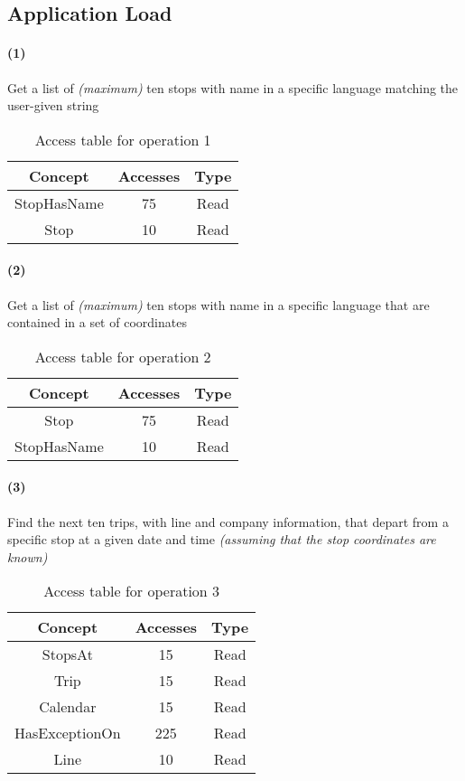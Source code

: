 \newpage
\subsection{Application Load}

\paragraph{(1)} Get a list of \textit{(maximum)} ten stops with name in a specific language matching the user-given string

\begin{table}[h]
	\centering
	\begin{tabular}{|c|c|c|}
		\hline
		\textbf{Concept} & \textbf{Accesses} & \textbf{Type} \\
		\hline
		StopHasName & 75 & Read \\ \hline
		Stop & 10 & Read \\ \hline
	\end{tabular}
	\caption{Access table for operation 1}\label{tbl:rest.access-1}
\end{table}

\paragraph{(2)} Get a list of \textit{(maximum)} ten stops with name in a specific language that are contained in a set of coordinates

\begin{table}[h]
	\centering
	\begin{tabular}{|c|c|c|}
		\hline
		\textbf{Concept} & \textbf{Accesses} & \textbf{Type} \\
		\hline
		Stop & 75 & Read \\ \hline
		StopHasName & 10 & Read \\ \hline
	\end{tabular}
	\caption{Access table for operation 2}\label{tbl:rest.access-2}
\end{table}

\paragraph{(3)} Find the next ten trips, with line and company information, that depart from a specific stop at a given date and time \textit{(assuming that the stop coordinates are known)}
\begin{table}[h]
	\centering
	\begin{tabular}{|c|c|c|}
		\hline
		\textbf{Concept} & \textbf{Accesses} & \textbf{Type} \\
		\hline
		StopsAt & 15 & Read \\ \hline
		Trip & 15 & Read \\ \hline
		Calendar & 15 & Read \\ \hline
		HasExceptionOn & 225 & Read \\ \hline
		Line & 10 & Read \\ \hline
	\end{tabular}
	\caption{Access table for operation 3}\label{tbl:rest.access-3}
\end{table}

